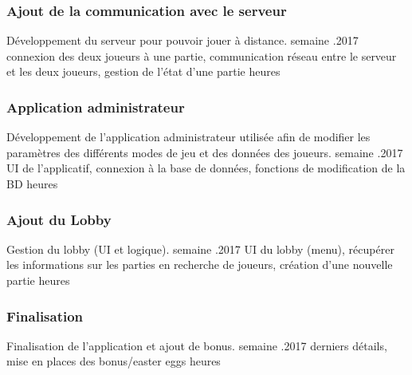 \documentclass[a4paper,12pt]{article}
\begin{document}
	\subsubsection{Ajout de la communication avec le serveur}
	\begin{enumerate}[labelwidth=5em,leftmargin=8em]
		\objectif Développement du serveur pour pouvoir jouer à distance.
		 semaine
		.2017
		\partageTache connexion des deux joueurs à une partie, communication réseau entre le serveur et les deux joueurs, gestion de l'état d'une partie
		 heures
	\end{enumerate}
	
	\subsubsection{Application administrateur}
	\begin{enumerate}[labelwidth=5em,leftmargin=8em]
		\objectif Développement de l'application administrateur utilisée afin de modifier les paramètres des différents modes de jeu et des données des joueurs.
		 semaine
		.2017
		\partageTache UI de l'applicatif, connexion à la base de données, fonctions de modification de la BD
		 heures
	\end{enumerate}
	
	\subsubsection{Ajout du Lobby}
	\begin{enumerate}[labelwidth=5em,leftmargin=8em]
		\objectif Gestion du lobby (UI et logique).
		 semaine
		.2017
		\partageTache UI du lobby (menu), récupérer les informations sur les parties en recherche de joueurs, création d'une nouvelle partie
		 heures
	\end{enumerate}
	
	\subsubsection{Finalisation}
	\begin{enumerate}[labelwidth=5em,leftmargin=8em]
		\objectif Finalisation de l'application et ajout de bonus.
		 semaine
		.2017
		\partageTache derniers détails, mise en places des bonus/easter eggs
		 heures
	\end{enumerate}
	
	
\end{document}
